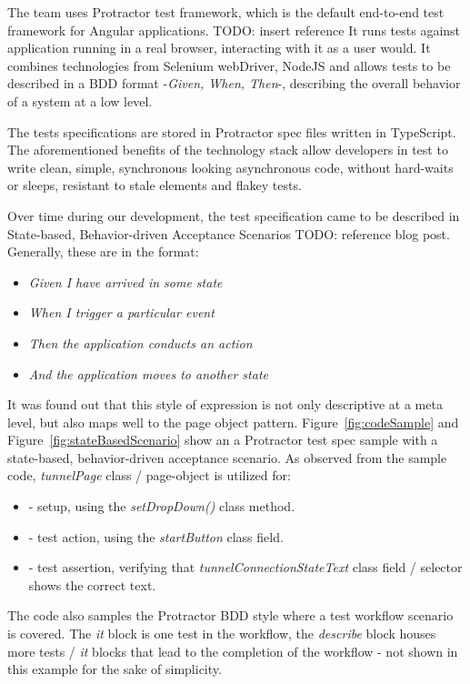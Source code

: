 \documentclass[conference]{IEEEtran}
\newcommand{\todo}[1]{}
\renewcommand{\todo}[1]{{\color{red} TODO: {#1}}}
\begin{document}
	The team uses Protractor test framework, which is the default end-to-end test framework for Angular applications. \todo{insert reference}
	It runs tests against application running in a real browser, interacting with it as a user would.
	It combines technologies from Selenium webDriver, NodeJS and allows tests to be described in a BDD format -\textit{Given, When, Then}-, describing the overall behavior of a system at a low level.
	
	The tests specifications are stored in Protractor spec files written in TypeScript. 
	The aforementioned benefits of the technology stack allow developers in test to write clean, simple, synchronous looking asynchronous code, without hard-waits or sleeps, resistant to stale elements and flakey tests.

	Over time during our development, the test specification came to be described in State-based, Behavior-driven Acceptance Scenarios \todo{reference blog post}. 
	Generally, these are in the format:


	\begin{itemize}
		\item [] \textit{Given I have arrived in some state} 
		\item [] \textit{When I trigger a particular event} 
		\item [] \textit{Then the application conducts an action}
		\item [] \textit{And the application moves to another state}
	\end{itemize}

	It was found out that this style of expression is not only descriptive at a meta level, but also maps well to the page object pattern.
	Figure~\ref{fig:codeSample} and Figure~\ref{fig:stateBasedScenario} show an a Protractor test spec sample with a state-based, behavior-driven acceptance scenario.
	As observed from the sample code, \textit{tunnelPage} class / page-object is utilized for:
	
	\begin{itemize}
		\item [] - setup, using the \textit{setDropDown()} class method. 
		\item [] - test action, using the \textit{startButton} class field.
		\item [] - test assertion, verifying that \textit{tunnelConnectionStateText} class field / selector shows the correct text.
	\end{itemize}

	The code also samples the Protractor BDD style where a test workflow scenario is covered. 
	The \textit{it} block is one test in the workflow, the \textit{describe} block houses more tests / \textit{it} blocks that lead to the completion of the workflow - not shown in this example for the sake of simplicity.
	
\end{document}
